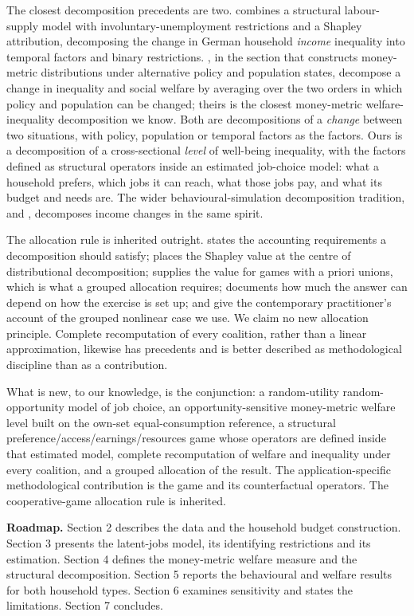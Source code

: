 The closest decomposition precedents are two. \citet{muehlhan2023} combines a structural labour-supply model with involuntary-unemployment restrictions and a Shapley attribution, decomposing the change in German household \emph{income} inequality into temporal factors and binary restrictions. \citet{creedyherault2011}, in the section that constructs money-metric distributions under alternative policy and population states, decompose a change in inequality and social welfare by averaging over the two orders in which policy and population can be changed; theirs is the closest money-metric welfare-inequality decomposition we know. Both are decompositions of a \emph{change} between two situations, with policy, population or temporal factors as the factors. Ours is a decomposition of a cross-sectional \emph{level} of well-being inequality, with the factors defined as structural operators inside an estimated job-choice model: what a household prefers, which jobs it can reach, what those jobs pay, and what its budget and needs are. The wider behavioural-simulation decomposition tradition, \citet{bargain2012} and \citet{jessen2019}, decomposes income changes in the same spirit.

The allocation rule is inherited outright. \citet{shorrocks1982} states the accounting requirements a decomposition should satisfy; \citet{shorrocks2013} places the Shapley value at the centre of distributional decomposition; \citet{owen1977} supplies the value for games with a priori unions, which is what a grouped allocation requires; \citet{sastretrannoy2002} documents how much the answer can depend on how the exercise is set up; and \citet{audoly2025} give the contemporary practitioner's account of the grouped nonlinear case we use. We claim no new allocation principle. Complete recomputation of every coalition, rather than a linear approximation, likewise has precedents and is better described as methodological discipline than as a contribution.

What is new, to our knowledge, is the conjunction: a random-utility random-opportunity model of job choice, an opportunity-sensitive money-metric welfare level built on the own-set equal-consumption reference, a structural preference/access/earnings/resources game whose operators are defined inside that estimated model, complete recomputation of welfare and inequality under every coalition, and a grouped allocation of the result. The application-specific methodological contribution is the game and its counterfactual operators. The cooperative-game allocation rule is inherited.

\textbf{Roadmap.} Section 2 describes the data and the household budget construction. Section 3 presents the latent-jobs model, its identifying restrictions and its estimation. Section 4 defines the money-metric welfare measure and the structural decomposition. Section 5 reports the behavioural and welfare results for both household types. Section 6 examines sensitivity and states the limitations. Section 7 concludes.

